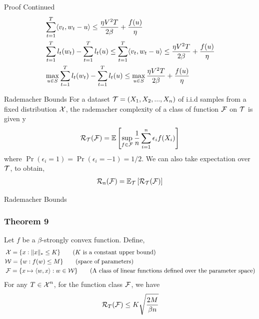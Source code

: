 \begin{frame}{Proof Continued}
    \begin{align*}    
      & \sum_{t=1}^T \langle {v_t} , {w_t - u} \rangle \le \frac{\eta V^2T}{2\beta} + \frac{f(u)}{\eta} \\
      & \sum_{t=1}^T l_t(w_t) - \sum_{t=1}^T l_t(u) \le \sum_{t=1}^T \langle {v_t} , {w_t - u} \rangle \le \frac{\eta V^2T}{2\beta} + \frac{f(u)}{\eta} \\
      & \max_{u \in S} \sum_{t=1}^T l_t(w_t) - \sum_{t=1}^T l_t(u) \le \max_{u \in S} \frac{\eta V^2T}{2\beta} + \frac{f(u)}{\eta}
    \end{align*}  
\end{frame}


\begin{frame}{Rademacher Bounds}
  For a dataset $\operatorname{\mathcal{T}}=(X_1,X_2,...,X_n)$ of i.i.d samples from a fixed distribution $\operatorname{\mathcal{X}}$, the rademacher complexity of a class of function $\operatorname{\mathcal{F}}$ on $\operatorname{\mathcal{T}}$ is given y
  \begin{align*}
    \operatorname{\mathcal{R}}_{\operatorname{\mathcal{T}}}(\operatorname{\mathcal{F}}) = \operatorname{\mathbb{E}} \left[ \sup_{f \in \operatorname{\mathcal{F}}} \frac{1}{n}\sum_{i=1}^n \epsilon_i f(X_i) \right]
  \end{align*}
  where $\Pr(\epsilon_i = 1) = \Pr(\epsilon_i = -1) = 1/2$.
  We can also take expectation over $\operatorname{\mathcal{T}}$, to obtain,
  \begin{align*}
    \operatorname{\mathcal{R}}_n(\operatorname{\mathcal{F}})=\operatorname{\mathbb{E}}_{\operatorname{\mathcal{T}}}\left[\operatorname{\mathcal{R}}_{\operatorname{\mathcal{T}}}(\operatorname{\mathcal{F}})\right]
  \end{align*}
\end{frame}

\begin{frame}{Rademacher Bounds}
    \frametitle{Theorem 9}
    Let $f$ be a $\beta$-strongly convex function. Define,
    \begin{align*}
      & \operatorname{\mathcal{X}} = \{ x : \|x\|_{*} \le K \} \tag{$K$ is a constant upper bound}\\
      & \mathcal{W} = \{w : f(w) \le M\} \tag{space of parameters}\\
      & \operatorname{\mathcal{F}} = \{ x \mapsto \langle {w} , {x} \rangle : w \in \mathcal{W} \} \tag{A class of linear functions defined over the parameter space}
    \end{align*}
    For any $T \in \operatorname{\mathcal{X}}^n$, for the function class $\operatorname{\mathcal{F}}$, we have
    \begin{align*}
      & \operatorname{\mathcal{R}}_T(\operatorname{\mathcal{F}}) \le K\sqrt{\frac{2M}{\beta n}} \\
    \end{align*}
\end{frame}

